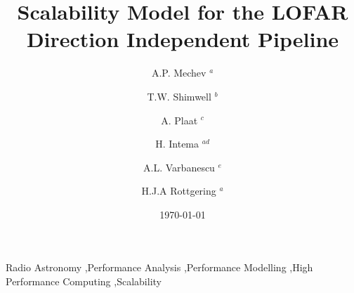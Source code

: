 \documentclass[preprint,5p]{elsarticle}
\begin{document}
\sloppy
{}
\begin{frontmatter}


\title{Scalability Model for the LOFAR Direction Independent Pipeline}%
\author{A.P. Mechev $^a$}

\author{T.W. Shimwell $^b$}%
\author{A. Plaat $^c$}%
\author{H. Intema $^{ad}$}%
\author{A.L. Varbanescu $^e$}
\author{H.J.A Rottgering $^a$}%

\date{\today} 
\address{$^a$ Leiden Observatory, Niels Bohrweg 2, 2333 CA Leiden, the Netherlands}
\address{$^b$ ASTRON, Oude Hoogeveensedijk 4, 7991 PD , The Netherlands }
\address{$^c$ Leiden Institute of Advanced Computer Science, Niels Bohrweg 1, 2333 CA Leiden, the Netherlands}
\address{$^d$ International Centre for Radio Astronomy Research -- Curtin University, GPO Box U1987, Perth, WA 6845, Australia}
\address{$^e$ University of Amsterdam, Spui 21, 1012 WX Amsterdam, the Netherlands}


\begin{abstract}

\end{abstract}
\begin{keyword}
Radio Astronomy \sep Performance Analysis \sep Performance Modelling \sep High Performance Computing \sep Scalability


\end{keyword}
\end{frontmatter}

%
\end{document}
